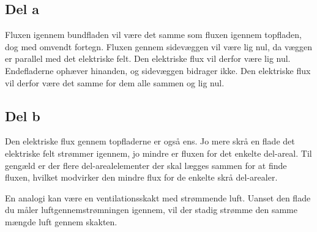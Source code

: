 \subsection{Del a} %
\label{sub:del_a}
Fluxen igennem bundfladen vil være det samme som fluxen igennem topfladen, dog med omvendt fortegn. Fluxen gennem sidevæggen vil være lig nul, da væggen er parallel med det elektriske felt. Den elektriske flux vil derfor være lig nul. Endefladerne ophæver hinanden, og sidevæggen  bidrager ikke. Den elektriske flux vil derfor være det samme for dem alle sammen og lig nul.

\subsection{Del b} %
\label{sub:del_b}
Den elektriske flux gennem topfladerne er også ens. Jo mere skrå en flade det elektriske felt strømmer igennem, jo mindre er fluxen for det enkelte del-areal. Til gengæld er der flere del-arealelementer der skal lægges sammen for at finde fluxen, hvilket modvirker den mindre flux for de enkelte skrå del-arealer.

En analogi kan være en ventilationsskakt med strømmende luft. Uanset den flade du måler luftgennemstrømningen igennem, vil der stadig strømme den samme mængde luft gennem skakten.
